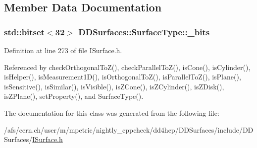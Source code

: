 \subsection{Member Data Documentation}
\hypertarget{class_d_d_surfaces_1_1_surface_type_ac6414dd53b60dfcc487030c3ba1a3220}{
\subsubsection[{\_\-bits}]{\setlength{\rightskip}{0pt plus 5cm}std::bitset$<$32$>$ {\bf DDSurfaces::SurfaceType::\_\-bits}}}
\label{class_d_d_surfaces_1_1_surface_type_ac6414dd53b60dfcc487030c3ba1a3220}


Definition at line 273 of file ISurface.h.

Referenced by checkOrthogonalToZ(), checkParallelToZ(), isCone(), isCylinder(), isHelper(), isMeasurement1D(), isOrthogonalToZ(), isParallelToZ(), isPlane(), isSensitive(), isSimilar(), isVisible(), isZCone(), isZCylinder(), isZDisk(), isZPlane(), setProperty(), and SurfaceType().

The documentation for this class was generated from the following file:\begin{DoxyCompactItemize}
\item 
/afs/cern.ch/user/m/mpetric/nightly\_\-cppcheck/dd4hep/DDSurfaces/include/DDSurfaces/\hyperlink{_i_surface_8h}{ISurface.h}\end{DoxyCompactItemize}
